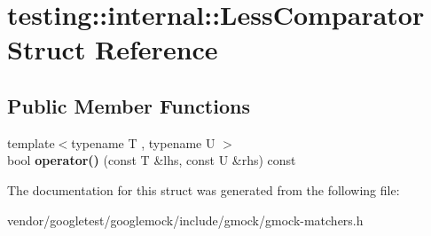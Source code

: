 \hypertarget{structtesting_1_1internal_1_1LessComparator}{}\section{testing\+:\+:internal\+:\+:Less\+Comparator Struct Reference}
\label{structtesting_1_1internal_1_1LessComparator}
\subsection*{Public Member Functions}
\begin{DoxyCompactItemize}
\item 
{\footnotesize template$<$typename T , typename U $>$ }\\bool {\bfseries operator()} (const T \&lhs, const U \&rhs) const \hypertarget{structtesting_1_1internal_1_1LessComparator_a74d518d2783406f4888d8a0162cf2c9d}{}\label{structtesting_1_1internal_1_1LessComparator_a74d518d2783406f4888d8a0162cf2c9d}

\end{DoxyCompactItemize}


The documentation for this struct was generated from the following file\+:\begin{DoxyCompactItemize}
\item 
vendor/googletest/googlemock/include/gmock/gmock-\/matchers.\+h\end{DoxyCompactItemize}
